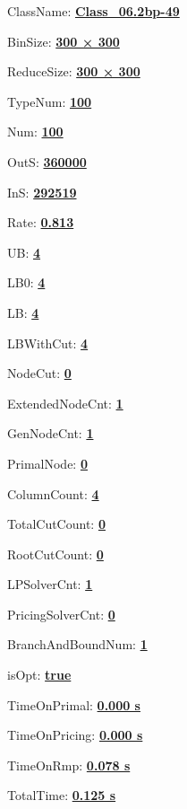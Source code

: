 \documentclass[11pt]{article}
\begin{document}
\pagestyle{empty}


ClassName: \underline{\textbf{Class_06.2bp-49}}
\par
BinSize: \underline{\textbf{300 × 300}}
\par
ReduceSize: \underline{\textbf{300 × 300}}
\par
TypeNum: \underline{\textbf{100}}
\par
Num: \underline{\textbf{100}}
\par
OutS: \underline{\textbf{360000}}
\par
InS: \underline{\textbf{292519}}
\par
Rate: \underline{\textbf{0.813}}
\par
UB: \underline{\textbf{4}}
\par
LB0: \underline{\textbf{4}}
\par
LB: \underline{\textbf{4}}
\par
LBWithCut: \underline{\textbf{4}}
\par
NodeCut: \underline{\textbf{0}}
\par
ExtendedNodeCnt: \underline{\textbf{1}}
\par
GenNodeCnt: \underline{\textbf{1}}
\par
PrimalNode: \underline{\textbf{0}}
\par
ColumnCount: \underline{\textbf{4}}
\par
TotalCutCount: \underline{\textbf{0}}
\par
RootCutCount: \underline{\textbf{0}}
\par
LPSolverCnt: \underline{\textbf{1}}
\par
PricingSolverCnt: \underline{\textbf{0}}
\par
BranchAndBoundNum: \underline{\textbf{1}}
\par
isOpt: \underline{\textbf{true}}
\par
TimeOnPrimal: \underline{\textbf{0.000 s}}
\par
TimeOnPricing: \underline{\textbf{0.000 s}}
\par
TimeOnRmp: \underline{\textbf{0.078 s}}
\par
TotalTime: \underline{\textbf{0.125 s}}
\par
\newpage
\end{document}
